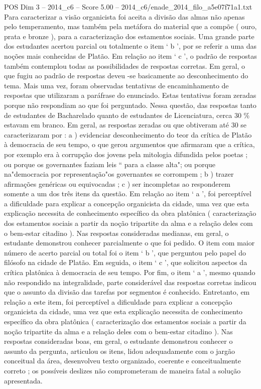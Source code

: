 \begin{textsample}{POS Dim 3 – 2014\_c6 – Score 5.00 – 2014\_c6/enade\_2014\_filo\_a5e07f71a1.txt}
Para caracterizar a visão organicista foi aceita a divisão das almas não apenas pelo temperamento, mas também pela metáfora do material que a compõe ( ouro, prata e bronze ), para a caracterização dos estamentos sociais.
Uma grande parte dos estudantes acertou parcial ou totalmente o item ‘ b ’, por se referir a uma das noções mais conhecidas de Platão.
Em relação ao item ‘ c ’, o padrão de respostas também contemplou todas as possibilidades de respostas corretas.
Em geral, o que fugiu ao padrão de respostas deveu -se basicamente ao desconhecimento do tema.
Mais uma vez, foram observadas tentativas de encaminhamento de respostas que utilizaram a paráfrase do enunciado.
Estas tentativas foram zeradas porque não respondiam ao que foi perguntado.
Nessa questão, das respostas tanto de estudantes de Bacharelado quanto de estudantes de Licenciatura, cerca 30 \% estavam em branco.
Em geral, as respostas zeradas ou que obtiveram até 30 se caracterizaram por : a ) evidenciar desconhecimento do teor da crítica de Platão à democracia de seu tempo, o que gerou argumentos que afirmaram que a crítica, por exemplo era à corrupção dos jovens pela mitologia difundida pelos poetas ; ou porque os governantes faziam leis “ para a classe alta"; ou porque na"democracia por representação"os governantes se corrompem ; b ) trazer afirmações genéricas ou equivocadas ; c ) ser incompletas ao responderem somente a um dos três itens da questão.
Em relação ao item ‘ a ’, foi perceptível a dificuldade para explicar a concepção organicista da cidade, uma vez que esta explicação necessita de conhecimento específico da obra platônica ( caracterização dos estamentos sociais a partir da noção tripartite da alma e a relação deles com o bem-estar citadino ).
Nas respostas consideradas medianas, em geral, o estudante demonstrou conhecer parcialmente o que foi pedido.
O item com maior número de acerto parcial ou total foi o item ‘ b ’, que perguntou pelo papel do filósofo na cidade de Platão.
Em seguida, o item ‘ c ’, que solicitou aspectos da crítica platônica à democracia de seu tempo.
Por fim, o item ‘ a ’, mesmo quando não respondido na integralidade, parte considerável das respostas corretas indicou que o assunto da divisão das tarefas por segmentos é conhecido.
Entretanto, em relação a este item, foi perceptível a dificuldade para explicar a concepção organicista da cidade, uma vez que esta explicação necessita de conhecimento específico da obra platônica ( caracterização dos estamentos sociais a partir da noção tripartite da alma e a relação deles com o bem-estar citadino ).
Nas respostas consideradas boas, em geral, o estudante demonstrou conhecer o assunto da pergunta, articulou os itens, lidou adequadamente com o jargão conceitual da área, desenvolveu texto organizado, coerente e conceitualmente correto ; os possíveis deslizes não comprometeram de maneira fatal a solução apresentada.

\end{textsample}
